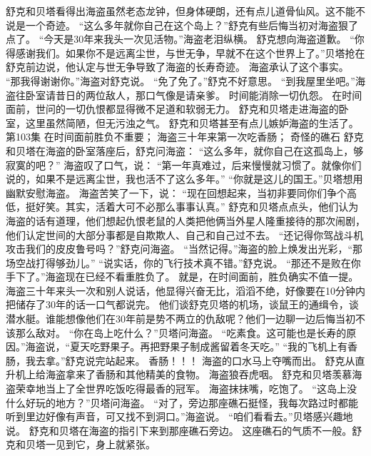 \documentclass[a4paper,12pt,UTF8,twoside]{ctexbook}
\begin{document}
        舒克和贝塔看得出海盗虽然老态龙钟，但身体硬朗，还有点儿道骨仙风。这不能不说是一个奇迹。 
        “这么多年就你自己在这个岛上？”舒克有些后悔当初对海盗狠了点了。 
        “今天是30年来我头一次见活物。”海盗老泪纵横。 
        舒克想向海盗道歉。 
        “你得感谢我们。如果你不是远离尘世，与世无争，早就不在这个世界上了。”贝塔抢在舒克前边说，他认定与世无争导致了海盗的长寿奇迹。 
        海盗承认了这个事实。 
        “那我得谢谢你。”海盗对舒克说。 
        “免了免了。”舒克不好意思。 
        “到我屋里坐吧。”海盗往卧室请昔日的两位敌人，那口气像是请亲爹。 
        时间能消除一切仇怨。 
        在时间面前，世问的一切仇恨都显得微不足道和软弱无力。 
        舒克和贝塔走进海盗的卧室，这里虽然简陋，但无污浊之气。 
        舒克和贝塔甚至有点儿嫉妒海盗的生活了。   第103集 
        在时间面前胜负不重要； 
        海盗三十年来第一次吃香肠； 
        奇怪的礁石   
        舒克和贝塔在海盗的卧室落座后，舒克问海盗： 
        “这么多年，就你自己在这孤岛上，够寂寞的吧？” 
        海盗叹了口气，说：  “第一年真难过，后来慢慢就习惯了。就像你们说的，如果不是远离尘世，我也活不了这么多年。” 
        “你就是这儿的国王。”贝塔想用幽默安慰海盗。 
        海盗苦笑了一下，说：  “现在回想起来，当初非要同你们争个高低，挺好笑。其实，活着大可不必那么事事认真。” 
        舒克和贝塔点点头，他们认为海盗的话有道理，他们想起仇恨老鼠的人类把他俩当外星人隆重接待的那次闹剧，他们认定世间的大部分事都是自欺欺人、自己和自己过不去。 
        “还记得你驾战斗机攻击我们的皮皮鲁号吗？”舒克问海盗。 
        “当然记得。”海盗的脸上焕发出光彩，“那场空战打得够劲儿。” 
        “说实话，你的飞行技术真不错。”舒克说。 
        “那还不是败在你手下了。”海盗现在已经不看重胜负了。 
        就是，在时间面前，胜负确实不值一提。 
        海盗三十年来头一次和别人说话，他显得兴奋无比，滔滔不绝，好像要在10分钟内把储存了30年的话一口气都说完。 
        他们谈舒克贝塔的机场，谈鼠王的通缉令，谈潜水艇。谁能想像他们在30年前是势不两立的仇敌呢？他们一边聊一边后悔当初不该那么敌对。 
        “你在岛上吃什么？”贝塔问海盗。 
        “吃素食。这可能也是长寿的原因。”海盗说，“夏天吃野果子。再把野果子制成酱留着冬天吃。” 
        “我的飞机上有香肠，我去拿。”舒克说完站起来。 
        香肠！！！ 
        海盗的口水马上夺嘴而出。 
        舒克从直升机上给海盗拿来了香肠和其他精美的食物。 
        海盗狼吞虎咽。 
        舒克和贝塔羡慕海盗荣幸地当上了全世界吃饭吃得最香的冠军。 
        海盗抹抹嘴，吃饱了。 
        “这岛上没什么好玩的地方？”贝塔问海盗。 
        “对了，旁边那座礁石挺怪，我每次路过时都能听到里边好像有声音，可又找不到洞口。”海盗说。 
        “咱们看看去。”贝塔感兴趣地说。 
        舒克和贝塔在海盗的指引下来到那座礁石旁边。 
        这座礁石的气质不一般。舒克和贝塔一见到它，身上就紧张。 
\end{document}
